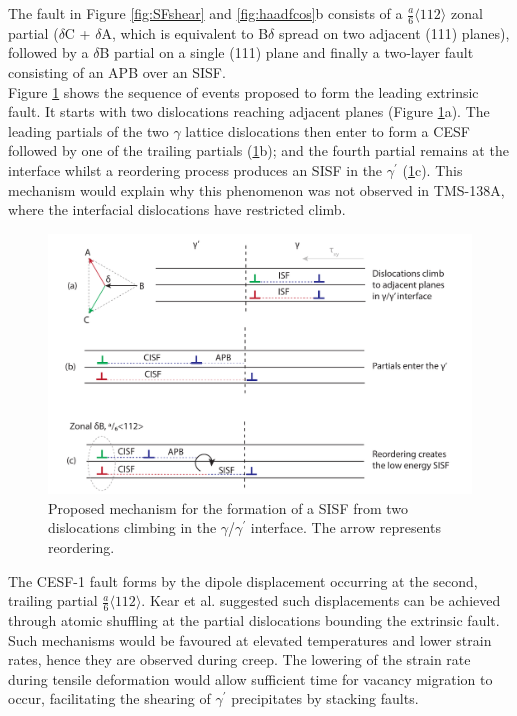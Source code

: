 \documentclass[a4paper,12pt,times,numbered,print,index]{Classes/PhDThesisPSnPDF}
\begin{document}
The fault in Figure \ref{fig:SFshear} and \ref{fig:haadfcos}b consists of a $\frac{a}{6}\langle112\rangle$ zonal partial ($\delta$C + $\delta$A, which is equivalent to B$\delta$ spread on two adjacent (111) planes), followed by a $\delta$B partial on a single (111) plane and finally a two-layer fault consisting of an APB over an SISF.\\
Figure \ref{fig:CESF_mech} shows the sequence of events proposed to form the leading extrinsic fault. It starts with two dislocations reaching adjacent planes (Figure \ref{fig:CESF_mech}a). The leading partials of the two $\gamma$ lattice dislocations then enter to form a CESF followed by one of the trailing partials (\ref{fig:CESF_mech}b); and the fourth partial remains at the interface whilst a reordering process produces an SISF in the $\gamma^\prime$ (\ref{fig:CESF_mech}c). This mechanism would explain why this phenomenon was not observed in TMS-138A, where the interfacial dislocations have restricted climb.\\
\begin{figure}
\centering
\includegraphics[width=\linewidth, keepaspectratio]{Figures/CESF_mech2_schem.pdf}
\caption{{Proposed mechanism for the f}ormation of a SISF from two dislocations climbing in the $\gamma$/$\gamma^\prime$ interface. The arrow represents reordering.}
\label{fig:CESF_mech}
\end{figure}
The CESF-1 fault forms by the dipole displacement occurring at the second, trailing partial $\frac{a}{6}\langle112\rangle$. Kear et al. suggested such displacements can be achieved through atomic shuffling at the partial dislocations bounding the extrinsic fault. Such mechanisms would be favoured at elevated temperatures and lower strain rates, hence they are observed during creep. The lowering of the strain rate during tensile deformation would allow sufficient time for vacancy migration to occur, facilitating the shearing of $\gamma^\prime$ precipitates by stacking faults.\\
\end{document}
